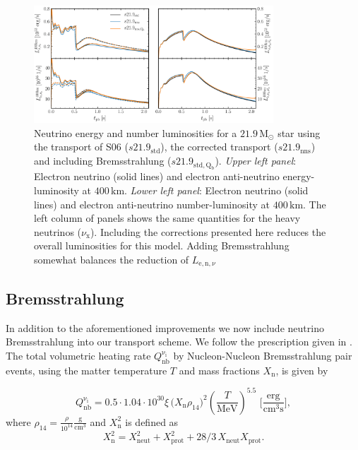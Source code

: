 \documentclass[fleqn,usenatbib]{mnras}
\begin{document}
\begin{appendices}
 \begin{figure}
 \centering
 \includegraphics[width=0.8\textwidth]{./pic/s21_9_trans_tests.pdf}
 \caption{Neutrino energy and number luminosities for a $21.9\,\mathrm{M_{\odot}}$ star using the transport of S06 ($s21.9_{\mathrm{std}}$), the corrected transport ($s21.9_{\mathrm{nns}}$) and including Bremsstrahlung ($s21.9_{\mathrm{std,Q_b}}$). \textit{Upper left panel}: Electron neutrino (solid lines) and electron anti-neutrino energy-luminosity at $400\,\mathrm{km}$. \textit{Lower left panel}: Electron neutrino (solid lines) and electron anti-neutrino number-luminosity at $400\,\mathrm{km}$. The left column of panels shows the same quantities for the heavy neutrinos ($\nu_{\mathrm{x}}$). Including the corrections presented here reduces the overall luminosities for this model. Adding Bremsstrahlung somewhat balances the reduction of $L_{\mathrm{e,n},\nu}$}
 \label{fig:s21.9_tras}
\end{figure}

 \subsection{Bremsstrahlung}

 In addition to the aforementioned improvements we now include neutrino Bremsstrahlung into our transport scheme. We follow the prescription given in \cite{Burrows2006}.
 The total volumetric heating rate $ Q_{\mathrm{nb}}^{\mathrm{\nu_i}}$ by Nucleon-Nucleon Bremsstrahlung pair events, using the matter temperature $T$ and mass fractions $X_{\mathrm{n}}$, is given by

\begin{equation}
    Q_{\mathrm{nb}}^{\mathrm{\nu_i}} = 0.5\cdot 1.04\cdot 10^{30} \xi \, \big(X_{\mathrm{n}}\rho_{14}\big)^2 (\frac{T}{\mathrm{MeV}})^{5.5} \,\, \Big[\frac{\mathrm{erg}}{\mathrm{cm^3s}}\Big],
\end{equation}
where $\rho_{14} = \frac{\rho}{10^{14}} \mathrm{\frac{g}{cm^3}} $
and $X_{\mathrm{n}}^2$ is defined as
\begin{equation*}
 X_{\mathrm{n}}^2 = X_{\mathrm{neut}}^2 + X_{\mathrm{prot}}^2 + 28/3\, X_{\mathrm{neut}}X_{\mathrm{prot}}.
\end{equation*}


\end{appendices}
\end{document}
